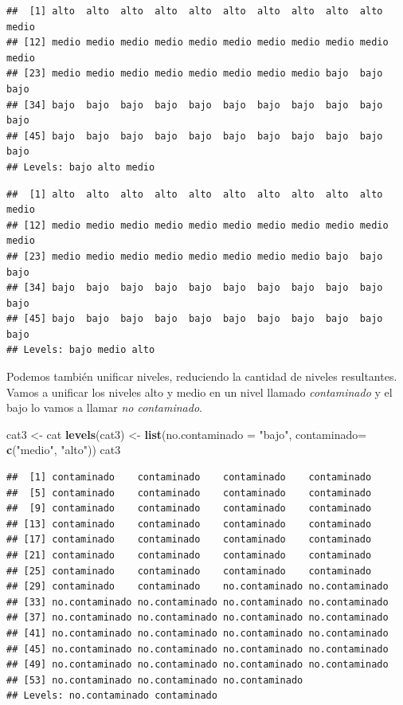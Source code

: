 \documentclass[]{article}
\newenvironment{Shaded}{\begin{snugshade}}{\end{snugshade}}
\newcommand{\KeywordTok}[1]{\textcolor[rgb]{0.13,0.29,0.53}{\textbf{{#1}}}}
\newcommand{\DataTypeTok}[1]{\textcolor[rgb]{0.13,0.29,0.53}{{#1}}}
\newcommand{\StringTok}[1]{\textcolor[rgb]{0.31,0.60,0.02}{{#1}}}
\newcommand{\NormalTok}[1]{{#1}}
\begin{document}
\begin{verbatim}
##  [1] alto  alto  alto  alto  alto  alto  alto  alto  alto  alto  medio
## [12] medio medio medio medio medio medio medio medio medio medio medio
## [23] medio medio medio medio medio medio medio medio bajo  bajo  bajo 
## [34] bajo  bajo  bajo  bajo  bajo  bajo  bajo  bajo  bajo  bajo  bajo 
## [45] bajo  bajo  bajo  bajo  bajo  bajo  bajo  bajo  bajo  bajo  bajo 
## Levels: bajo alto medio
\end{verbatim}

\begin{verbatim}
##  [1] alto  alto  alto  alto  alto  alto  alto  alto  alto  alto  medio
## [12] medio medio medio medio medio medio medio medio medio medio medio
## [23] medio medio medio medio medio medio medio medio bajo  bajo  bajo 
## [34] bajo  bajo  bajo  bajo  bajo  bajo  bajo  bajo  bajo  bajo  bajo 
## [45] bajo  bajo  bajo  bajo  bajo  bajo  bajo  bajo  bajo  bajo  bajo 
## Levels: bajo medio alto
\end{verbatim}

Podemos también unificar niveles, reduciendo la cantidad de niveles
resultantes. Vamos a unificar los niveles alto y medio en un nivel
llamado \emph{contaminado} y el bajo lo vamos a llamar \emph{no
contaminado}.

\begin{Shaded}
\begin{Highlighting}[]
\NormalTok{cat3 <-}\StringTok{ }\NormalTok{cat}
\KeywordTok{levels}\NormalTok{(cat3) <-}\StringTok{ }\KeywordTok{list}\NormalTok{(}\DataTypeTok{no.contaminado =} \StringTok{"bajo"}\NormalTok{, }\DataTypeTok{contaminado=} \KeywordTok{c}\NormalTok{(}\StringTok{"medio"}\NormalTok{, }\StringTok{"alto"}\NormalTok{))}
\NormalTok{cat3}
\end{Highlighting}
\end{Shaded}

\begin{verbatim}
##  [1] contaminado    contaminado    contaminado    contaminado   
##  [5] contaminado    contaminado    contaminado    contaminado   
##  [9] contaminado    contaminado    contaminado    contaminado   
## [13] contaminado    contaminado    contaminado    contaminado   
## [17] contaminado    contaminado    contaminado    contaminado   
## [21] contaminado    contaminado    contaminado    contaminado   
## [25] contaminado    contaminado    contaminado    contaminado   
## [29] contaminado    contaminado    no.contaminado no.contaminado
## [33] no.contaminado no.contaminado no.contaminado no.contaminado
## [37] no.contaminado no.contaminado no.contaminado no.contaminado
## [41] no.contaminado no.contaminado no.contaminado no.contaminado
## [45] no.contaminado no.contaminado no.contaminado no.contaminado
## [49] no.contaminado no.contaminado no.contaminado no.contaminado
## [53] no.contaminado no.contaminado no.contaminado
## Levels: no.contaminado contaminado
\end{verbatim}
\end{document}
